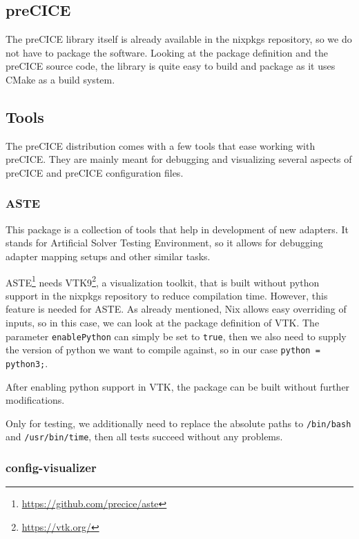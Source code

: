 \documentclass{eceasst}
\begin{document}
\subsection{preCICE}

The preCICE library itself is already available in the nixpkgs repository, so we do not have to package the software.
Looking at the package definition and the preCICE source code, the library is quite easy to build and package as it uses CMake as a build system.

\subsection{Tools}

The preCICE distribution comes with a few tools that ease working with preCICE.
They are mainly meant for debugging and visualizing several aspects of preCICE and preCICE configuration files.

\subsubsection{ASTE}

This package is a collection of tools that help in development of new adapters.
It stands for Artificial Solver Testing Environment, so it allows for debugging adapter mapping setups and other similar tasks.

ASTE\footnote{\url{https://github.com/precice/aste}} needs VTK9\footnote{\url{https://vtk.org/}}, a visualization toolkit, that is built without python support in the nixpkgs repository to reduce compilation time.
However, this feature is needed for ASTE.
As already mentioned, Nix allows easy overriding of inputs, so in this case, we can look at the package definition of VTK.
The parameter \texttt{enablePython} can simply be set to \texttt{true}, then we also need to supply the version of python we want to compile against, so in our case \texttt{python = python3;}.

After enabling python support in VTK, the package can be built without further modifications.

Only for testing, we additionally need to replace the absolute paths to \texttt{/bin/bash} and \texttt{/usr/bin/time}, then all tests succeed without any problems.

\subsubsection{config-visualizer}
\end{document}
